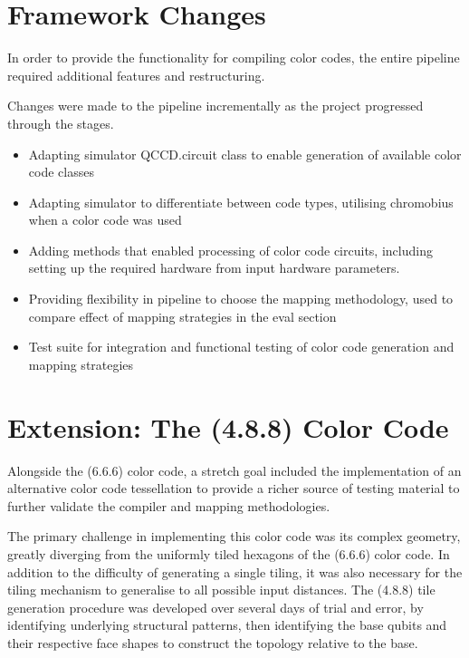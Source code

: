 \section{Framework Changes}

In order to provide the functionality for compiling color codes, the entire pipeline required additional features and restructuring.

Changes were made to the pipeline incrementally as the project progressed through the stages.


\begin{itemize}
    \item Adapting simulator QCCD.circuit class to enable generation of available color code classes 
    \item Adapting simulator to differentiate between code types, utilising chromobius when a color code was used
    \item Adding methods that enabled processing of color code circuits, including setting up the required hardware from input hardware parameters.
    \item Providing flexibility in pipeline to choose the mapping methodology, used to compare effect of mapping strategies in the eval section 
    \item Test suite for integration and functional testing of color code generation and mapping strategies 
    
\end{itemize}
\section{Extension: The (4.8.8) Color Code}

Alongside the (6.6.6) color code, a stretch goal included the implementation of an alternative color code tessellation to provide a richer source of testing material to further validate the compiler and mapping methodologies. 

The primary challenge in implementing this color code was its complex geometry, greatly diverging from the uniformly tiled hexagons of the (6.6.6) color code. In addition to the difficulty of generating a single tiling, it was also necessary for the tiling mechanism to generalise to all possible input distances.
The (4.8.8) tile generation procedure was developed over several days of trial and error, by identifying underlying structural patterns, then identifying the base qubits and their respective face shapes to construct the topology relative to the base.  

